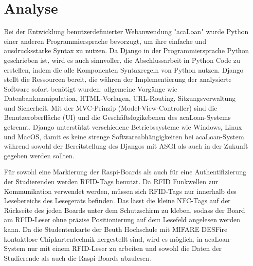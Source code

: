\chapter{Analyse}
\label{sec:analyse}
Bei der Entwicklung benutzerdefinierter Webanwendung "acaLoan" wurde Python einer anderen Programmiersprache bevorzugt, um ihre einfache und ausdrucksstarke Syntax zu nutzen. Da Django in der Programmiersprache Python geschrieben ist, wird es auch sinnvoller, die Abschlussarbeit in Python Code zu erstellen, indem die alle Komponenten Syntaxregeln von Python nutzen. Django stellt die Ressourcen bereit, die währen der Implementierung der analysierte Software sofort benötigt wurden: allgemeine Vorgänge wie Datenbankmanipulation, HTML-Vorlagen, URL-Routing, Sitzungsverwaltung und Sicherheit. Mit der MVC-Prinzip (Model-View-Controller) sind die Benutzeroberfläche (UI) und die Geschäftslogikebenen des acaLoan-Systems getrennt. Django unterstützt verschiedene Betriebssysteme wie Windows, Linux und MacOS, damit es keine strenge Softwareabhängigkeiten bei acaLoan-System während sowohl der Bereitstellung des Djangos mit ASGI als auch in der Zukunft gegeben werden sollten. 

Für sowohl eine Markierung der Raspi-Boards als auch für eine Authentifizierung der Studierenden werden RFID-Tags benutzt. Da RFID Funkwellen zur Kommunikation verwendet werden, müssen sich RFID-Tags nur innerhalb des Lesebereichs des Lesegeräts befinden. Das lässt die kleine NFC-Tags auf der Rückseite des jeden Boards unter dem Schutzschirm zu kleben, sodass der Board am RFID-Leser ohne präzise Positionierung auf dem Lesefeld angelesen werden kann. Da die Studentenkarte der Beuth Hochschule mit MIFARE DESFire kontaktlose Chipkartentechnik hergestellt sind, wird es möglich, in acaLoan-System nur mit einem RFID-Leser zu arbeiten und sowohl die Daten der Studierende als auch die Raspi-Boards abzulesen. 

